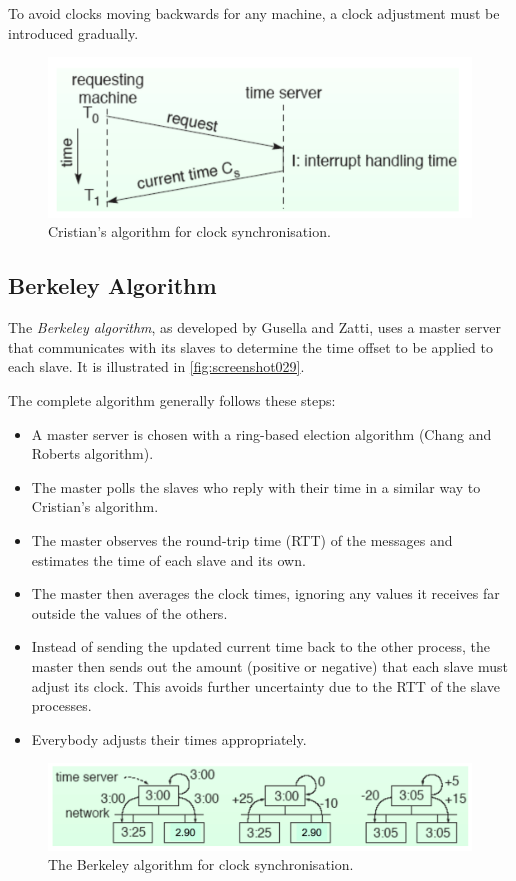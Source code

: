 To avoid clocks moving backwards for any machine, a clock adjustment must be introduced gradually.

\begin{figure}
\centering
\includegraphics[width=0.7\linewidth]{figures/screenshot028}
\caption{Cristian's algorithm for clock synchronisation.}
\label{fig:screenshot028}
\end{figure}

\subsection{Berkeley Algorithm}
The \textit{Berkeley algorithm}, as developed by Gusella and Zatti, uses a master server that communicates with its slaves to determine the time offset to be applied to each slave. It is illustrated in \autoref{fig:screenshot029}.

The complete algorithm generally follows these steps:
\begin{itemize}
\item A master server is chosen with a ring-based election algorithm (Chang and 
Roberts algorithm). 
\item The master polls the slaves who reply with their time in a similar way to Cristian's algorithm.
\item The master observes the round-trip time (RTT) of the messages and estimates the time of each slave and its own.  
\item The master then averages the clock times, ignoring any values it receives far outside the values of the others. 
\item Instead of sending the updated current time back to the other process, the master
 then sends out the amount (positive or negative) that each slave must adjust its clock. This avoids further uncertainty due to the RTT of the slave processes.  
\item Everybody adjusts their times appropriately.
\end{itemize}

\begin{figure}
\centering
\includegraphics[width=0.7\linewidth]{figures/screenshot029}
\caption{The Berkeley algorithm for clock synchronisation.}
\label{fig:screenshot029}
\end{figure}

